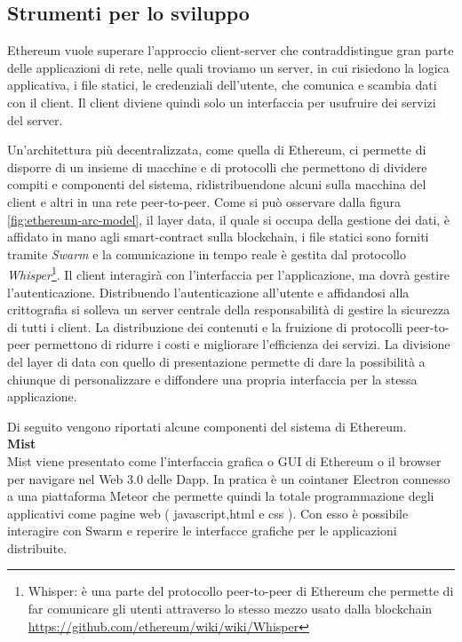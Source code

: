 	\subsection{Strumenti per lo sviluppo}
	Ethereum vuole superare l'approccio client-server che contraddistingue gran parte delle applicazioni di rete, nelle quali troviamo un server, in cui risiedono la logica applicativa, i file statici, le credenziali dell'utente, che comunica e scambia dati con il client. Il client diviene quindi solo un interfaccia per usufruire dei servizi del server. 
	
	Un'architettura più decentralizzata, come quella di Ethereum, ci permette di disporre di un insieme di macchine e di protocolli che permettono di dividere compiti e componenti del sistema, ridistribuendone alcuni sulla macchina del client e altri in una rete peer-to-peer. Come si può osservare dalla figura \ref{fig:ethereum-arc-model}, il layer data, il quale si occupa della gestione dei dati, è affidato in mano agli smart-contract sulla blockchain, i file statici sono forniti tramite \textit{Swarm} e la comunicazione in tempo reale è gestita dal protocollo \textit{Whisper}\footnote{Whisper: è una parte del protocollo peer-to-peer di Ethereum che permette di far comunicare gli utenti attraverso lo stesso mezzo usato dalla blockchain \url{https://github.com/ethereum/wiki/wiki/Whisper}}. Il client interagirà con l'interfaccia per l'applicazione, ma dovrà gestire l'autenticazione. 
	Distribuendo l'autenticazione all'utente e affidandosi alla crittografia si solleva un server centrale della responsabilità di gestire la sicurezza di tutti i client. La distribuzione dei contenuti e la fruizione di protocolli peer-to-peer permettono di ridurre i costi e migliorare l'efficienza dei servizi.
	La divisione del layer di data con quello di presentazione permette di dare la possibilità a chiunque di personalizzare e diffondere una propria interfaccia per la stessa applicazione.

	Di seguito vengono riportati alcune componenti del sistema di Ethereum.\\
		
	\textbf{Mist}\\
	
	Mist viene presentato come l'interfaccia grafica o GUI di Ethereum o il browser per navigare nel Web 3.0 delle Dapp. In pratica è un cointaner Electron connesso a una piattaforma Meteor che permette quindi la totale programmazione degli applicativi come pagine web ( javascript,html e css ). Con esso è possibile interagire con Swarm e reperire le interfacce grafiche per le applicazioni distribuite. \\
	
